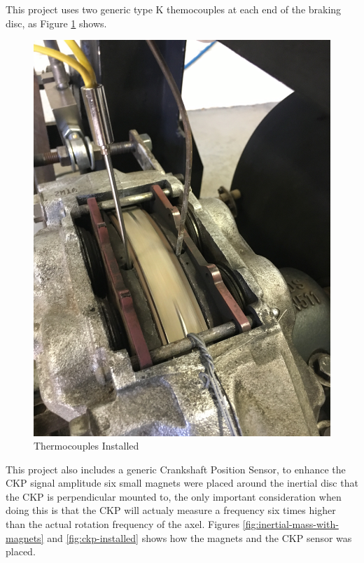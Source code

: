 		This project uses two generic type K themocouples at each end of the braking disc, as Figure \ref{fig:thermocouple-installation} shows.

		\begin{figure}[htbp]
			\centering
			\includegraphics[scale=0.7]{figuras/fig-thermocouple-installation}
			\caption{Thermocouples Installed}
			\label{fig:thermocouple-installation}
		\end{figure}
		\par

		This project also includes a generic Crankshaft Position Sensor, to enhance the CKP signal amplitude six small magnets were placed around the inertial disc that the CKP is perpendicular mounted to, the only important consideration when doing this is that the CKP will actualy measure a frequency six times higher than the actual rotation frequency of the axel. Figures \ref{fig:inertial-mass-with-magnets} and \ref{fig:ckp-installed} shows how the magnets and the CKP sensor was placed.

